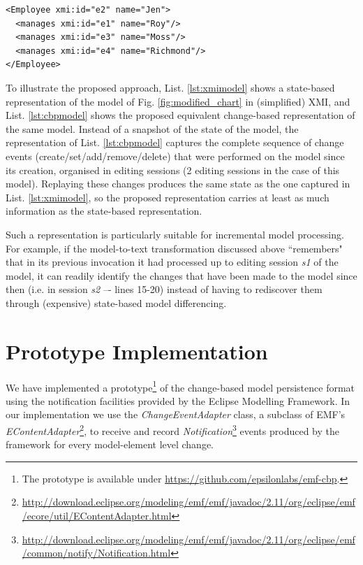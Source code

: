 \documentclass[conference]{IEEEtran}
\begin{document}
\begin{lstlisting}[style=xmi,caption={State-based representation of the model of Figure \ref{fig:modified_chart} in (simplified) XMI.},label=lst:xmimodel]
<Employee xmi:id="e2" name="Jen">
  <manages xmi:id="e1" name="Roy"/>
  <manages xmi:id="e3" name="Moss"/>
  <manages xmi:id="e4" name="Richmond"/>
</Employee>
\end{lstlisting}

To illustrate the proposed approach, List. \ref{lst:xmimodel} shows a state-based representation of the model of Fig. \ref{fig:modified_chart} in (simplified) XMI, and List. \ref{lst:cbpmodel} shows the proposed equivalent change-based representation of the same model. Instead of a snapshot of the state of the model, the representation of List. \ref{lst:cbpmodel} captures the complete sequence of change events (create/set/add/remove/delete) that were performed on the model since its creation, organised in editing sessions (2 editing sessions in the case of this model). Replaying these changes produces the same state as the one captured in List. \ref{lst:xmimodel}, so the proposed representation carries at least as much information as the state-based representation.

Such a representation is particularly suitable for incremental model processing. For example, if the model-to-text transformation discussed above ``remembers" that in its previous invocation it had processed up to editing session \emph{s1} of the model, it can readily identify the changes that have been made to the model since then (i.e. in session \emph{s2} –- lines 15-20) instead of having to rediscover them through (expensive) state-based model differencing.

\section{Prototype Implementation}
\label{sec:prototype_implementation}
We have implemented a prototype\footnote{The prototype is available under \url{https://github.com/epsilonlabs/emf-cbp}.} of the change-based model persistence format using the notification facilities provided by the Eclipse Modelling Framework. In our implementation we use the \emph{ChangeEventAdapter} class, a subclass of EMF's \emph{EContentAdapter}\footnote{\url{http://download.eclipse.org/modeling/emf/emf/javadoc/2.11/org/eclipse/emf/ecore/util/EContentAdapter.html}}, to receive and record \emph{Notification}\footnote{\url{http://download.eclipse.org/modeling/emf/emf/javadoc/2.11/org/eclipse/emf/common/notify/Notification.html}} events produced by the framework for every model-element level change.
\end{document}
